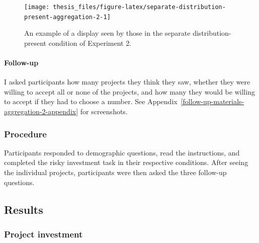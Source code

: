 \documentclass[a4paper, nobind, dvipsnames]{templates/ociamthesis}
\theoremstyle{definition}
\theoremstyle{definition}
\theoremstyle{definition}
\theoremstyle{definition}
\theoremstyle{remark}
\begin{document}
\begin{figure}
\texttt{[image: thesis\_files/figure-latex/separate-distribution-present-aggregation-2-1]} \caption{An example of a display seen by those in the separate distribution-present condition of Experiment 2.}\label{fig:separate-distribution-present-aggregation-2}
\end{figure}

\hypertarget{follow-up-aggregation-2}{%
\paragraph{Follow-up}\label{follow-up-aggregation-2}}

I asked participants how many projects they think they saw, whether they were
willing to accept all or none of the projects, and how many they would
be willing to accept if they had to choose a number. See
Appendix~\ref{follow-up-materials-aggregation-2-appendix} for screenshots.

\subsubsection{Procedure}

Participants responded to demographic questions, read the instructions, and
completed the risky investment task in their respective conditions. After seeing
the individual projects, participants were then asked the three follow-up
questions.

\hypertarget{results-aggregation-2}{%
\subsection{Results}\label{results-aggregation-2}}

\subsubsection{Project investment}
\end{document}
